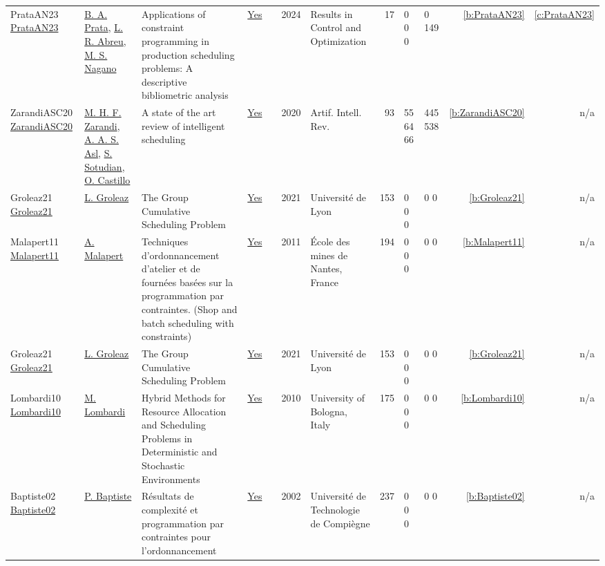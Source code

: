 {\begin{longtable}{>{\raggedright\arraybackslash}p{3cm}>{\raggedright\arraybackslash}p{4.5cm}>{\raggedright\arraybackslash}p{6.0cm}rrrp{2.5cm}rp{1cm}p{1cm}rr}
PrataAN23 \href{https://www.sciencedirect.com/science/article/pii/S2666720723001522}{PrataAN23} & \hyperref[auth:a385]{B. A. Prata}, \hyperref[auth:a386]{L. R. Abreu}, \hyperref[auth:a387]{M. S. Nagano} & \cellcolor{gold!20}Applications of constraint programming in production scheduling problems: A descriptive bibliometric analysis & \href{../works/PrataAN23.pdf}{Yes} & \cite{PrataAN23} & 2024 & Results in Control and Optimization & 17 & 0 0 0 & 0 149 & \ref{b:PrataAN23} & \ref{c:PrataAN23}\\
ZarandiASC20 \href{https://doi.org/10.1007/s10462-018-9667-6}{ZarandiASC20} & \hyperref[auth:a829]{M. H. F. Zarandi}, \hyperref[auth:a830]{A. A. S. Asl}, \hyperref[auth:a831]{S. Sotudian}, \hyperref[auth:a832]{O. Castillo} & A state of the art review of intelligent scheduling & \href{../works/ZarandiASC20.pdf}{Yes} & \cite{ZarandiASC20} & 2020 & Artif. Intell. Rev. & 93 & 55 64 66 & 445 538 & \ref{b:ZarandiASC20} & n/a\\
Groleaz21 \href{https://hal.science/tel-03266690}{Groleaz21} & \hyperref[auth:a83]{L. Groleaz} & {The Group Cumulative Scheduling Problem} & \href{../works/Groleaz21.pdf}{Yes} & \cite{Groleaz21} & 2021 & {Universit{\'e} de Lyon} & 153 & 0 0 0 & 0 0 & \ref{b:Groleaz21} & n/a\\
Malapert11 \href{https://tel.archives-ouvertes.fr/tel-00630122}{Malapert11} & \hyperref[auth:a82]{A. Malapert} & Techniques d'ordonnancement d'atelier et de fourn{\'{e}}es bas{\'{e}}es sur la programmation par contraintes. (Shop and batch scheduling with constraints) & \href{../works/Malapert11.pdf}{Yes} & \cite{Malapert11} & 2011 & {\'{E}}cole des mines de Nantes, France & 194 & 0 0 0 & 0 0 & \ref{b:Malapert11} & n/a\\
Groleaz21 \href{https://hal.science/tel-03266690}{Groleaz21} & \hyperref[auth:a83]{L. Groleaz} & {The Group Cumulative Scheduling Problem} & \href{../works/Groleaz21.pdf}{Yes} & \cite{Groleaz21} & 2021 & {Universit{\'e} de Lyon} & 153 & 0 0 0 & 0 0 & \ref{b:Groleaz21} & n/a\\
Lombardi10 \href{http://amsdottorato.unibo.it/2961/}{Lombardi10} & \hyperref[auth:a142]{M. Lombardi} & Hybrid Methods for Resource Allocation and Scheduling Problems in Deterministic and Stochastic Environments & \href{../works/Lombardi10.pdf}{Yes} & \cite{Lombardi10} & 2010 & University of Bologna, Italy & 175 & 0 0 0 & 0 0 & \ref{b:Lombardi10} & n/a\\
Baptiste02 \href{https://theses.hal.science/tel-00124998}{Baptiste02} & \hyperref[auth:a162]{P. Baptiste} & {R{\'e}sultats de complexit{\'e} et programmation par contraintes pour l'ordonnancement} & \href{../works/Baptiste02.pdf}{Yes} & \cite{Baptiste02} & 2002 & {Universit{\'e} de Technologie de Compi{\`e}gne} & 237 & 0 0 0 & 0 0 & \ref{b:Baptiste02} & n/a\\

\end{longtable}}
